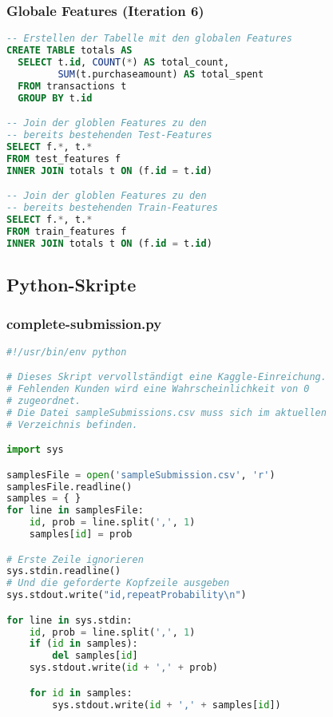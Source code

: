 \subsubsection{Globale Features (Iteration 6)}
\label{code:totals}
\begin{lstlisting}[language=SQL]
-- Erstellen der Tabelle mit den globalen Features
CREATE TABLE totals AS
  SELECT t.id, COUNT(*) AS total_count, 
         SUM(t.purchaseamount) AS total_spent
  FROM transactions t
  GROUP BY t.id

-- Join der globlen Features zu den 
-- bereits bestehenden Test-Features
SELECT f.*, t.*
FROM test_features f
INNER JOIN totals t ON (f.id = t.id)

-- Join der globlen Features zu den 
-- bereits bestehenden Train-Features
SELECT f.*, t.*
FROM train_features f
INNER JOIN totals t ON (f.id = t.id)
\end{lstlisting}

\subsection{Python-Skripte}
\subsubsection{complete-submission.py}
\label{code:complete-submission}
\begin{lstlisting}[language=Python]
#!/usr/bin/env python

# Dieses Skript vervollständigt eine Kaggle-Einreichung.
# Fehlenden Kunden wird eine Wahrscheinlichkeit von 0 
# zugeordnet.
# Die Datei sampleSubmissions.csv muss sich im aktuellen 
# Verzeichnis befinden.

import sys

samplesFile = open('sampleSubmission.csv', 'r')
samplesFile.readline()
samples = { }
for line in samplesFile:
	id, prob = line.split(',', 1)
	samples[id] = prob

# Erste Zeile ignorieren
sys.stdin.readline()
# Und die geforderte Kopfzeile ausgeben
sys.stdout.write("id,repeatProbability\n")

for line in sys.stdin:
	id, prob = line.split(',', 1)
	if (id in samples):
		del samples[id]
	sys.stdout.write(id + ',' + prob)

	for id in samples:
		sys.stdout.write(id + ',' + samples[id])
\end{lstlisting}

